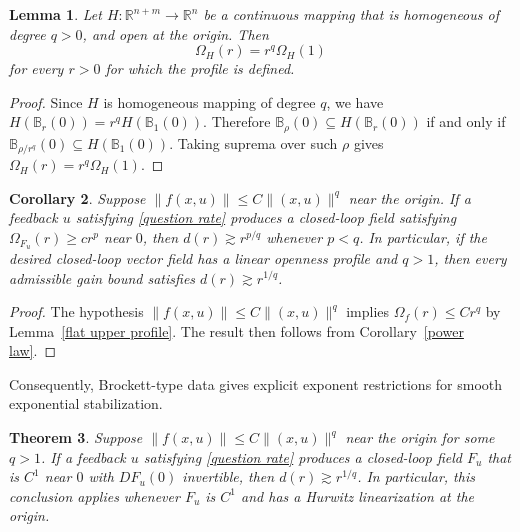 \documentclass[pdflatex,sn-mathphys-num]{sn-jnl}%
\theoremstyle{thmstyleone}%
\newtheorem{theorem}{Theorem}%
\newtheorem{lemma}[theorem]{Lemma}
\newtheorem{corollary}[theorem]{Corollary}
\theoremstyle{thmstyletwo}%
\theoremstyle{thmstylethree}%
\begin{document}

    \begin{lemma}\label{homogeneous exact profile}
        Let $H:\mathbb{R}^{n+m}\to\mathbb{R}^n$ be a continuous mapping that is homogeneous of degree $q>0$, and open at the origin. Then
        $$
            \Omega_H(r)=r^q\Omega_H(1)
        $$
        for every $r>0$ for which the profile is defined.
    \end{lemma}


    \begin{proof}
        Since $H$ is homogeneous mapping of degree $q$, we have $H(\mathbb{B}_r(0))=r^qH(\mathbb{B}_1(0))$.  Therefore $\mathbb{B}_\rho(0)\subseteq H(\mathbb{B}_r(0))$ if and only if $\mathbb{B}_{\rho/r^q}(0)\subseteq H(\mathbb{B}_1(0))$.  Taking suprema over such $\rho$ gives $\Omega_H(r)=r^q\Omega_H(1)$.
    \end{proof}


    \begin{corollary}\label{leading order upper profile}
        Suppose $\|f(x,u)\|\leq C\|(x,u)\|^q$ near the origin.  If a feedback $u$ satisfying \eqref{question rate} produces a closed-loop field satisfying $\Omega_{F_u}(r)\geq cr^p$ near $0$, then $d(r)\gtrsim r^{p/q}$ whenever $p<q$.  In particular, if the desired closed-loop vector field has a linear openness profile and $q>1$, then every admissible gain bound satisfies $d(r)\gtrsim r^{1/q}$.
    \end{corollary}


    \begin{proof}
        The hypothesis $\|f(x,u)\|\leq C\|(x,u)\|^q$ implies $\Omega_f(r)\leq Cr^q$ by Lemma~\ref{flat upper profile}.  The result then follows from Corollary~\ref{power law}.
    \end{proof}


    Consequently, Brockett-type data gives explicit exponent restrictions for smooth exponential stabilization.


    \begin{theorem}\label{smooth exponential gain obstruction}
        Suppose $\|f(x,u)\|\leq C\|(x,u)\|^q$ near the origin for some $q>1$.  If a feedback $u$ satisfying \eqref{question rate} produces a closed-loop field $F_u$ that is $C^1$ near $0$ with $DF_u(0)$ invertible, then $d(r)\gtrsim r^{1/q}$.  In particular, this conclusion applies whenever $F_u$ is $C^1$ and has a Hurwitz linearization at the origin.
    \end{theorem}
\end{document}
